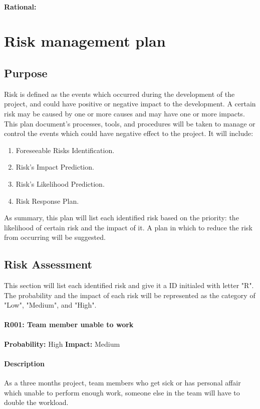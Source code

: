 \documentclass[11pt, a4paper]{report}
\begin{document}
\paragraph{Rational: \\}


\section{Risk management plan}
\subsection{Purpose}
Risk is defined as the events which occurred during the development of the project, and could have positive or negative impact to the development. A certain risk may be caused by one or more causes and may have one or more impacts. This plan document's processes, tools, and procedures will be taken to manage or control the events which could have negative effect to the project. It will include:
\begin{enumerate}
	\item Foreseeable Risks Identification.
	\item Risk's Impact Prediction.
	\item Risk's Likelihood Prediction.
	\item Risk Response Plan.
\end{enumerate}
As summary, this plan will list each identified risk based on the priority: the likelihood of certain risk and the impact of it. A plan in which to reduce the risk from occurring will be suggested.

\subsection{Risk Assessment}
This section will list each identified risk and give it a ID initialed with letter "R". The probability and the impact of each risk will be represented as the category of "Low", "Medium", and "High". \\




	\paragraph{R001: Team member unable to work} \hspace{1cm} \textbf{Probability: }High\hspace{1cm}   \textbf{Impact: }Medium
	\paragraph{Description}As a three months project, team members who get sick or has personal affair which unable to perform enough work, someone else in the team will have to double the workload.
\end{document}
